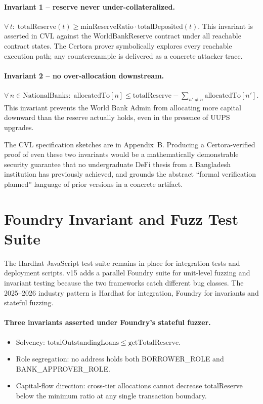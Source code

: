 \documentclass[12pt,a4paper]{report}
\begin{document}
\paragraph{Invariant 1 -- reserve never under-collateralized.}
\(\forall\, t:\; \mathrm{totalReserve}(t) \ge \mathrm{minReserveRatio} \cdot \mathrm{totalDeposited}(t).\)
This invariant is asserted in CVL against the WorldBankReserve contract under all reachable contract states. The Certora prover symbolically explores every reachable execution path; any counterexample is delivered as a concrete attacker trace.

\paragraph{Invariant 2 -- no over-allocation downstream.}
\(\forall\, n \in \mathrm{NationalBanks}:\; \mathrm{allocatedTo}[n] \le \mathrm{totalReserve} - \sum_{n' \ne n} \mathrm{allocatedTo}[n'].\)
This invariant prevents the World Bank Admin from allocating more capital downward than the reserve actually holds, even in the presence of UUPS upgrades.

The CVL specification sketches are in Appendix~B. Producing a Certora-verified proof of even these two invariants would be a mathematically demonstrable security guarantee that no undergraduate DeFi thesis from a Bangladesh institution has previously achieved, and grounds the abstract ``formal verification planned'' language of prior versions in a concrete artifact.

\section{Foundry Invariant and Fuzz Test Suite}
\label{sec:foundry}

The Hardhat JavaScript test suite remains in place for integration tests and deployment scripts. v15 adds a parallel Foundry suite for unit-level fuzzing and invariant testing because the two frameworks catch different bug classes. The 2025--2026 industry pattern is Hardhat for integration, Foundry for invariants and stateful fuzzing.

\paragraph{Three invariants asserted under Foundry's stateful fuzzer.}
\begin{itemize}[noitemsep]
\item Solvency: \(\mathrm{totalOutstandingLoans} \le \mathrm{getTotalReserve}\).
\item Role segregation: no address holds both BORROWER\_ROLE and BANK\_APPROVER\_ROLE.
\item Capital-flow direction: cross-tier allocations cannot decrease totalReserve below the minimum ratio at any single transaction boundary.
\end{itemize}
\end{document}
